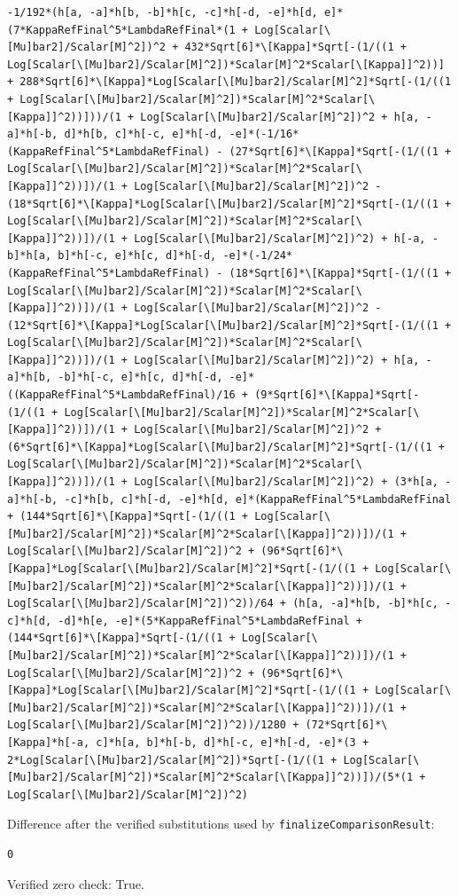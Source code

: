 \documentclass[11pt]{article}
\begin{document}
\begin{verbatim}
-1/192*(h[a, -a]*h[b, -b]*h[c, -c]*h[-d, -e]*h[d, e]*(7*KappaRefFinal^5*LambdaRefFinal*(1 + Log[Scalar[\[Mu]bar2]/Scalar[M]^2])^2 + 432*Sqrt[6]*\[Kappa]*Sqrt[-(1/((1 + Log[Scalar[\[Mu]bar2]/Scalar[M]^2])*Scalar[M]^2*Scalar[\[Kappa]]^2))] + 288*Sqrt[6]*\[Kappa]*Log[Scalar[\[Mu]bar2]/Scalar[M]^2]*Sqrt[-(1/((1 + Log[Scalar[\[Mu]bar2]/Scalar[M]^2])*Scalar[M]^2*Scalar[\[Kappa]]^2))]))/(1 + Log[Scalar[\[Mu]bar2]/Scalar[M]^2])^2 + h[a, -a]*h[-b, d]*h[b, c]*h[-c, e]*h[-d, -e]*(-1/16*(KappaRefFinal^5*LambdaRefFinal) - (27*Sqrt[6]*\[Kappa]*Sqrt[-(1/((1 + Log[Scalar[\[Mu]bar2]/Scalar[M]^2])*Scalar[M]^2*Scalar[\[Kappa]]^2))])/(1 + Log[Scalar[\[Mu]bar2]/Scalar[M]^2])^2 - (18*Sqrt[6]*\[Kappa]*Log[Scalar[\[Mu]bar2]/Scalar[M]^2]*Sqrt[-(1/((1 + Log[Scalar[\[Mu]bar2]/Scalar[M]^2])*Scalar[M]^2*Scalar[\[Kappa]]^2))])/(1 + Log[Scalar[\[Mu]bar2]/Scalar[M]^2])^2) + h[-a, -b]*h[a, b]*h[-c, e]*h[c, d]*h[-d, -e]*(-1/24*(KappaRefFinal^5*LambdaRefFinal) - (18*Sqrt[6]*\[Kappa]*Sqrt[-(1/((1 + Log[Scalar[\[Mu]bar2]/Scalar[M]^2])*Scalar[M]^2*Scalar[\[Kappa]]^2))])/(1 + Log[Scalar[\[Mu]bar2]/Scalar[M]^2])^2 - (12*Sqrt[6]*\[Kappa]*Log[Scalar[\[Mu]bar2]/Scalar[M]^2]*Sqrt[-(1/((1 + Log[Scalar[\[Mu]bar2]/Scalar[M]^2])*Scalar[M]^2*Scalar[\[Kappa]]^2))])/(1 + Log[Scalar[\[Mu]bar2]/Scalar[M]^2])^2) + h[a, -a]*h[b, -b]*h[-c, e]*h[c, d]*h[-d, -e]*((KappaRefFinal^5*LambdaRefFinal)/16 + (9*Sqrt[6]*\[Kappa]*Sqrt[-(1/((1 + Log[Scalar[\[Mu]bar2]/Scalar[M]^2])*Scalar[M]^2*Scalar[\[Kappa]]^2))])/(1 + Log[Scalar[\[Mu]bar2]/Scalar[M]^2])^2 + (6*Sqrt[6]*\[Kappa]*Log[Scalar[\[Mu]bar2]/Scalar[M]^2]*Sqrt[-(1/((1 + Log[Scalar[\[Mu]bar2]/Scalar[M]^2])*Scalar[M]^2*Scalar[\[Kappa]]^2))])/(1 + Log[Scalar[\[Mu]bar2]/Scalar[M]^2])^2) + (3*h[a, -a]*h[-b, -c]*h[b, c]*h[-d, -e]*h[d, e]*(KappaRefFinal^5*LambdaRefFinal + (144*Sqrt[6]*\[Kappa]*Sqrt[-(1/((1 + Log[Scalar[\[Mu]bar2]/Scalar[M]^2])*Scalar[M]^2*Scalar[\[Kappa]]^2))])/(1 + Log[Scalar[\[Mu]bar2]/Scalar[M]^2])^2 + (96*Sqrt[6]*\[Kappa]*Log[Scalar[\[Mu]bar2]/Scalar[M]^2]*Sqrt[-(1/((1 + Log[Scalar[\[Mu]bar2]/Scalar[M]^2])*Scalar[M]^2*Scalar[\[Kappa]]^2))])/(1 + Log[Scalar[\[Mu]bar2]/Scalar[M]^2])^2))/64 + (h[a, -a]*h[b, -b]*h[c, -c]*h[d, -d]*h[e, -e]*(5*KappaRefFinal^5*LambdaRefFinal + (144*Sqrt[6]*\[Kappa]*Sqrt[-(1/((1 + Log[Scalar[\[Mu]bar2]/Scalar[M]^2])*Scalar[M]^2*Scalar[\[Kappa]]^2))])/(1 + Log[Scalar[\[Mu]bar2]/Scalar[M]^2])^2 + (96*Sqrt[6]*\[Kappa]*Log[Scalar[\[Mu]bar2]/Scalar[M]^2]*Sqrt[-(1/((1 + Log[Scalar[\[Mu]bar2]/Scalar[M]^2])*Scalar[M]^2*Scalar[\[Kappa]]^2))])/(1 + Log[Scalar[\[Mu]bar2]/Scalar[M]^2])^2))/1280 + (72*Sqrt[6]*\[Kappa]*h[-a, c]*h[a, b]*h[-b, d]*h[-c, e]*h[-d, -e]*(3 + 2*Log[Scalar[\[Mu]bar2]/Scalar[M]^2])*Sqrt[-(1/((1 + Log[Scalar[\[Mu]bar2]/Scalar[M]^2])*Scalar[M]^2*Scalar[\[Kappa]]^2))])/(5*(1 + Log[Scalar[\[Mu]bar2]/Scalar[M]^2])^2)
\end{verbatim}
Difference after the verified substitutions used by \texttt{finalizeComparisonResult}:
\begin{verbatim}
0
\end{verbatim}
Verified zero check: True.
\end{document}
